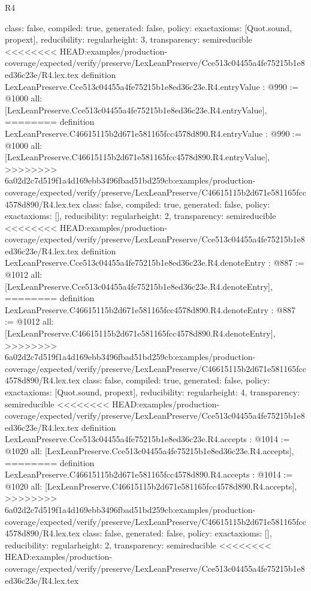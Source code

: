 \begin{lexlean}{R4}
\begin{coremodule}
{{{{{{{{{{{{{{{  class: false,
  compiled: true,
  generated: false,
  policy: exact{axioms: [Quot.sound, propext]},
  reducibility: regular{height: 3},
  transparency: semireducible
}
<<<<<<<< HEAD:examples/production-coverage/expected/verify/preserve/LexLeanPreserve/Cce513c04455a4fe75215b1e8ed36c23e/R4.lex.tex
definition LexLeanPreserve.Cce513c04455a4fe75215b1e8ed36c23e.R4.entryValue : @990 := @1000 {
  all: [LexLeanPreserve.Cce513c04455a4fe75215b1e8ed36c23e.R4.entryValue],
========
definition LexLeanPreserve.C46615115b2d671e581165fcc4578d890.R4.entryValue : @990 := @1000 {
  all: [LexLeanPreserve.C46615115b2d671e581165fcc4578d890.R4.entryValue],
>>>>>>>> 6a02d2c7d519f1a4d169ebb3496fbad51bd259cb:examples/production-coverage/expected/verify/preserve/LexLeanPreserve/C46615115b2d671e581165fcc4578d890/R4.lex.tex
  class: false,
  compiled: true,
  generated: false,
  policy: exact{axioms: []},
  reducibility: regular{height: 2},
  transparency: semireducible
}
<<<<<<<< HEAD:examples/production-coverage/expected/verify/preserve/LexLeanPreserve/Cce513c04455a4fe75215b1e8ed36c23e/R4.lex.tex
definition LexLeanPreserve.Cce513c04455a4fe75215b1e8ed36c23e.R4.denoteEntry : @887 := @1012 {
  all: [LexLeanPreserve.Cce513c04455a4fe75215b1e8ed36c23e.R4.denoteEntry],
========
definition LexLeanPreserve.C46615115b2d671e581165fcc4578d890.R4.denoteEntry : @887 := @1012 {
  all: [LexLeanPreserve.C46615115b2d671e581165fcc4578d890.R4.denoteEntry],
>>>>>>>> 6a02d2c7d519f1a4d169ebb3496fbad51bd259cb:examples/production-coverage/expected/verify/preserve/LexLeanPreserve/C46615115b2d671e581165fcc4578d890/R4.lex.tex
  class: false,
  compiled: true,
  generated: false,
  policy: exact{axioms: [Quot.sound, propext]},
  reducibility: regular{height: 4},
  transparency: semireducible
}
<<<<<<<< HEAD:examples/production-coverage/expected/verify/preserve/LexLeanPreserve/Cce513c04455a4fe75215b1e8ed36c23e/R4.lex.tex
definition LexLeanPreserve.Cce513c04455a4fe75215b1e8ed36c23e.R4.accepts : @1014 := @1020 {
  all: [LexLeanPreserve.Cce513c04455a4fe75215b1e8ed36c23e.R4.accepts],
========
definition LexLeanPreserve.C46615115b2d671e581165fcc4578d890.R4.accepts : @1014 := @1020 {
  all: [LexLeanPreserve.C46615115b2d671e581165fcc4578d890.R4.accepts],
>>>>>>>> 6a02d2c7d519f1a4d169ebb3496fbad51bd259cb:examples/production-coverage/expected/verify/preserve/LexLeanPreserve/C46615115b2d671e581165fcc4578d890/R4.lex.tex
  class: false,
  generated: false,
  policy: exact{axioms: []},
  reducibility: regular{height: 2},
  transparency: semireducible
}
<<<<<<<< HEAD:examples/production-coverage/expected/verify/preserve/LexLeanPreserve/Cce513c04455a4fe75215b1e8ed36c23e/R4.lex.tex
}}}}}}}}}}}}}}}}}
\end{coremodule}
\end{lexlean}

